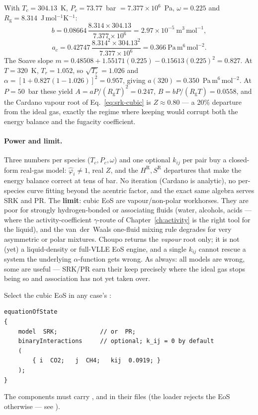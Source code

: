 \documentclass[11pt,a4paper]{article}
\newcommand{\Rgas}{R_{\!\mathrm{g}}}                %
\begin{document}
\begin{example}
With $T_c = 304.13$~K, $P_c = 73.77$~bar $= 7.377\times10^6$~Pa,
$\omega = 0.225$ and $\Rgas = 8.314$~J\,mol$^{-1}$K$^{-1}$:
\[
   b = 0.08664\,\frac{8.314 \times 304.13}{7.377\times10^6}
     = 2.97\times10^{-5}~\mathrm{m^3\,mol^{-1}},
\]
\[
   a_c = 0.42747\,\frac{8.314^2 \times 304.13^2}{7.377\times10^6}
       = 0.366~\mathrm{Pa\,m^6\,mol^{-2}}.
\]
The Soave slope $m = 0.48508 + 1.55171(0.225) -
0.15613(0.225)^2 = 0.827$.  At $T = 320$~K, $T_r = 1.052$, so
$\sqrt{T_r} = 1.026$ and $\alpha = [1 + 0.827(1 - 1.026)]^2 =
0.957$, giving $a(320) = 0.350$~Pa\,m$^6$\,mol$^{-2}$.  At $P = 50$~bar
these yield $A = a P/(\Rgas T)^2 = 0.247$, $B = bP/(\Rgas T) =
0.0558$, and the Cardano vapour root of Eq.~\eqref{eq:srk-cubic} is
$Z \approx 0.80$ --- a 20\% departure from the ideal gas, exactly the
regime where keeping  would corrupt both the
energy balance and the fugacity coefficient.
\end{example}

\paragraph{Power and limit.}
Three numbers per species ($T_c, P_c, \omega$) and one optional
$k_{ij}$ per pair buy a closed-form real-gas model: $\hat\varphi_i
\ne 1$, real $Z$, and the $H^{\mathrm R}, S^{\mathrm R}$ departures
that make the energy balance correct at tens of bar.  No iteration
(Cardano is analytic), no per-species curve fitting beyond the
acentric factor, and the exact same algebra serves SRK and PR.  The
\textbf{limit}: cubic EoS are vapour/non-polar workhorses.  They are
poor for strongly hydrogen-bonded or associating fluids (water,
alcohols, acids --- where the activity-coefficient $\gamma$-route of
Chapter~\ref{ch:activity} is the right tool for the liquid), and the
van~der~Waals one-fluid mixing rule degrades for very asymmetric or
polar mixtures.  Choupo returns the \emph{vapour} root only; it is
not (yet) a liquid-density or full-VLLE EoS engine, and a single
$k_{ij}$ cannot rescue a system the underlying $\alpha$-function gets
wrong.  As always: all models are wrong, some are useful --- SRK/PR
earn their keep precisely where the ideal gas stops being so and
association has not yet taken over.

\begin{tutoriallink}
Select the cubic EoS in any case's :
\begin{lstlisting}
equationOfState
{
    model  SRK;            // or  PR;
    binaryInteractions     // optional; k_ij = 0 by default
    (
        { i  CO2;   j  CH4;   kij  0.0919; }
    );
}
\end{lstlisting}
The components must carry ,  and  in
their  files (the loader rejects the EoS otherwise --- see
).
\end{tutoriallink}
\end{document}
